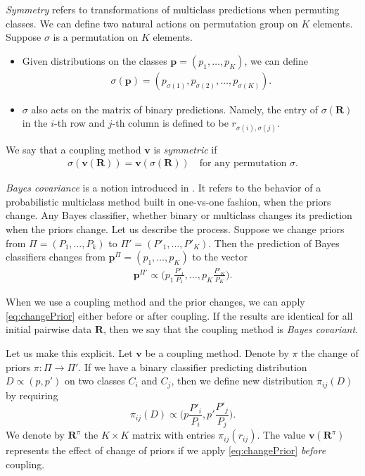 \emph{Symmetry} refers to transformations of multiclass predictions when permuting classes. We can define two natural actions on permutation group on $K$ elements. Suppose $\sigma$ is a permutation on $K$ elements. 

\begin{itemize}
	\item Given  distributions on the classes $\boldsymbol{p}= (p_1, \ldots, p_K)$, we can define
	\begin{align}
		\sigma(\boldsymbol{p})= (p_{\sigma(1)},p_{\sigma(2)}, \ldots, p_{\sigma(K)}).
	\end{align}
	 \item $\sigma$ also acts on the matrix of binary predictions. Namely, the entry of $\sigma(\boldsymbol{R})$ in the $i$-th row and $j$-th column is defined to be $r_{\sigma(i), \sigma(j)}$.
	 \end{itemize}
We say that a coupling method $\boldsymbol{v}$ is \emph{symmetric} if 
\begin{align}
		\sigma(\boldsymbol{v}(\boldsymbol{R})) = \boldsymbol{v}(\sigma(\boldsymbol{R}))\quad\textrm{for any permutation $\sigma$}. \label{eq:symmetry}
\end{align}

\emph{Bayes covariance} is a notion introduced in  \cite{vsuch2016bayes}. It refers to the behavior of a probabilistic multiclass method built in one-vs-one fashion, when the priors change. Any Bayes classifier, whether binary or multiclass changes its prediction when the priors change. Let us describe the process. Suppose we change priors from $\Pi = (P_1, \ldots, P_k)$ to $\Pi'= (P'_1, \ldots, P'_K)$. Then the prediction of Bayes classifiers changes from $\boldsymbol{p}^\Pi= (p_1, \ldots, p_K)$ to the vector 
\begin{align}
\boldsymbol{p}^{\Pi'} \propto \biggl(p_1 \frac{P'_1}{P_1}, \ldots, p_K \frac{P'_K}{P_K}\biggr). \label{eq:changePrior}
\end{align}

When we use a coupling method and the prior changes, we  can apply \eqref{eq:changePrior} either before or after coupling. If the results are identical for all initial pairwise data $\boldsymbol{R}$, then we say that the coupling method is \emph{Bayes covariant}. 

Let us make this explicit. Let $\boldsymbol{v}$ be a coupling method. Denote by  $\pi$ the change of priors $\pi:\Pi \rightarrow \Pi'$. If we have a  binary classifier predicting distribution $D \propto (p, p')$ on two classes $C_i$ and $C_j$, then we define new distribution $\pi_{ij}(D)$ by requiring
$$
\pi_{ij}(D) \propto \biggl(p \frac{P'_i}{P_i},p' \frac{P'_j}{P_j}\biggr).
$$
We denote by $\boldsymbol{R}^\pi$ the $K\times K$ matrix with entries $\pi_{ij}(r_{ij})$. The value $\boldsymbol{v}(\boldsymbol{R}^\pi)$ represents the effect of change of priors if we apply \eqref{eq:changePrior} \emph{before} coupling.

